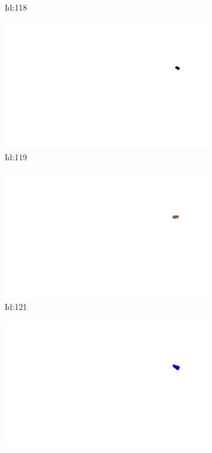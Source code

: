 \documentclass[12pt,twoside]{report}
\begin{document}
\begin{figure}
\begin{subfigure}[b]{0.20\textwidth}
\caption{Id:118}
\end{subfigure}
\begin{subfigure}[b]{0.20\textwidth}
\centering
\includegraphics[width=\textwidth]{../trajectories/119.png}
\caption{Id:119}
\end{subfigure}
\begin{subfigure}[b]{0.20\textwidth}
\centering
\includegraphics[width=\textwidth]{../trajectories/121.png}
\caption{Id:121}
\end{subfigure}
\begin{subfigure}[b]{0.20\textwidth}
\centering
\includegraphics[width=\textwidth]{../trajectories/123.png}

\end{subfigure}
\end{figure}
\end{document}
